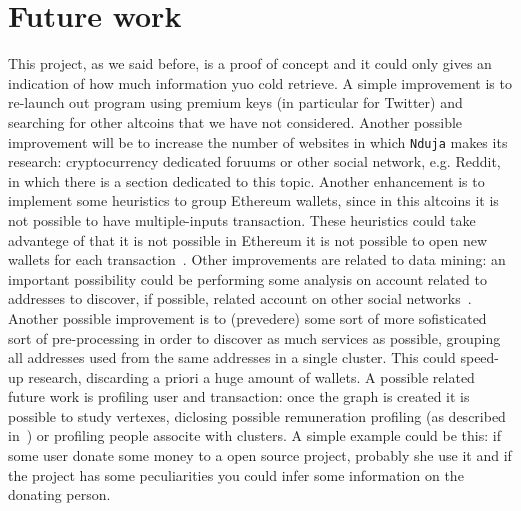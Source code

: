 \section{Future work}
This project, as we said before, is a proof of concept and it could only gives
an indication of how much information yuo cold retrieve. A simple improvement
is to re-launch out program using premium keys (in particular for Twitter) and
searching for other altcoins that we have not considered. Another possible
improvement will be to increase the number of websites in which \texttt{Nduja}
makes its research: cryptocurrency dedicated foruums or other social network,
e.g. Reddit, in which there is a section dedicated to this topic. Another
enhancement is to implement some heuristics to group Ethereum wallets, since in
this altcoins it is not possible to have multiple-inputs transaction. These
heuristics could take advantege of that it is not possible in Ethereum it is
not possible to open new wallets for each transaction~\cite{ethersok}. Other
improvements are related to data mining: an important possibility could be
performing some analysis on account related to addresses to discover, if
possible, related account on other social networks~\cite{osinference}. Another
possible improvement is to (prevedere) some sort of more sofisticated sort of
pre-processing in order to discover as much services as possible, grouping all
addresses used from the same addresses in a single cluster. This could speed-up
research, discarding a priori a huge amount of wallets. A possible related
future work is profiling user and transaction: once the graph is created it is
possible to study vertexes, diclosing possible remuneration profiling (as
described in~\cite{fullDiscl}) or profiling people associte with clusters. A
simple example could be this: if some user donate some money to a open source
project, probably she use it and if the project has some peculiarities you
could infer some information on the donating person.
